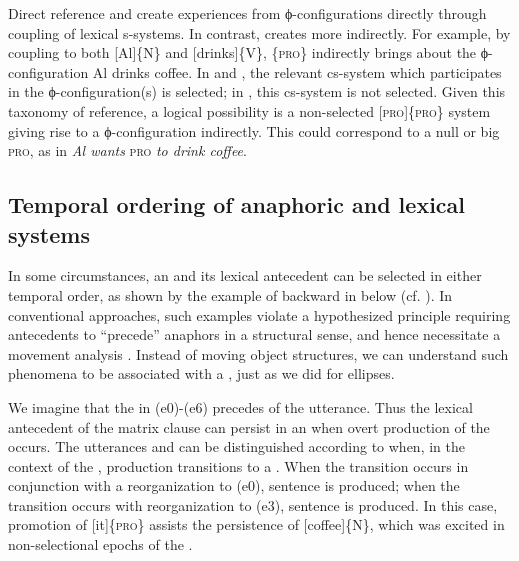 Direct reference and  create  experiences from ϕ-configurations directly through coupling of lexical s-systems. In contrast,  creates  more indirectly. For example, by coupling to both [Al]\{N\} and [drinks]\{V\}, \{\textsc{pro}\} indirectly brings about the ϕ-configuration {\textbar}Al drinks coffee{\textbar}. In  and , the relevant cs-system which participates in the ϕ-configuration(s) is selected; in , this cs-system is not selected. Given this taxonomy of reference, a logical possibility is a non-selected [\textsc{pro}]\{\textsc{pro}\} system giving rise to a ϕ-configuration indirectly. This could correspond to a null  or big \textsc{pro}, as in \textit{Al wants} \textsc{pro} \textit{to drink coffee}.

\subsection{Temporal ordering of anaphoric and lexical systems}

In some circumstances, an  and its lexical antecedent can be selected in either temporal order, as shown by the example of backward  in  below (cf. \citealt{KazaninaEtAl2007,ReulandAvrutin2005}). In conventional approaches, such examples violate a hypothesized principle requiring antecedents to “precede” anaphors in a structural sense, and hence necessitate a movement analysis \citep{Chomsky1993}. Instead of moving object structures, we can understand such phenomena to be associated with a , just as we did for ellipses.

  We imagine that the  in {} (e0)-(e6) precedes  of the utterance. Thus the lexical antecedent of the matrix clause can persist in an  when overt production of the  occurs. The utterances  and  can be distinguished according to when, in the context of the , production transitions to a . When the transition occurs in conjunction with a reorganization to (e0), sentence  is produced; when the transition occurs with reorganization to (e3), sentence  is produced. In this case, promotion of [it]\{\textsc{pro}\} assists the persistence of [coffee]\{N\}, which was excited in non-selectional epochs of the .

